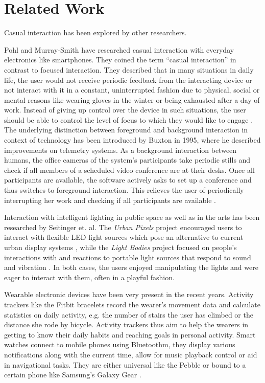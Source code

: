 \chapter{Related Work}
Casual interaction has been explored by other researchers.

Pohl and Murray-Smith have researched casual interaction with everyday electronics like smartphones. They coined the term ``casual interaction'' in contrast to focused interaction. They described that in many situations in daily life, the user would not receive periodic feedback from the interacting device or not interact with it in a constant, uninterrupted fashion due to physical, social or mental reasons like wearing gloves in the winter or being exhausted after a day of work. Instead of giving up control over the device in such situations, the user should be able to control the level of focus to which they would like to engage \cite{Pohl2013}. The underlying distinction between foreground and background interaction in context of technology has been introduced by Buxton in 1995, where he described improvements on telemetry systems. As a background interaction between humans, the office cameras of the system's participants take periodic stills and check if all members of a scheduled video conference are at their desks. Once all participants are available, the software actively asks to set up a conference and thus switches to foreground interaction. This relieves the user of periodically interrupting her work and checking if all participants are available \cite{Buxton1995}.

Interaction with intelligent lighting in public space as well as in the arts has been researched by Seitinger et. al. The \textit{Urban Pixels} project encouraged users to interact with flexible \ac{LED} light sources which pose an alternative to current urban display systems \cite{Seitinger2009}, while the \textit{Light Bodies} project focused on people's interactions with and reactions to portable light sources that respond to sound and vibration \cite{Seitinger2010}. In both cases, the users enjoyed manipulating the lights and were eager to interact with them, often in a playful fashion.

Wearable electronic devices have been very present in the recent years. Activity trackers like the Fitbit bracelets \cite{fitbit} record the wearer's movement data and calculate statistics on daily activity, e.g. the number of stairs the user has climbed or the distance she rode by bicycle. Activity trackers thus aim to help the wearers in getting to know their daily habits and reaching goals in personal activity. Smart watches connect to mobile phones using Bluetoothm, they display various notifications along with the current time, allow for music playback control or aid in navigational tasks. They are either universal like the Pebble \cite{pebble} or bound to a certain phone like Samsung's Galaxy Gear \cite{galaxygear}.

